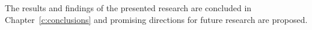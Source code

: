 The results and findings of the presented research are concluded in Chapter~\ref{c:conclusions} and promising directions for future research are proposed.


